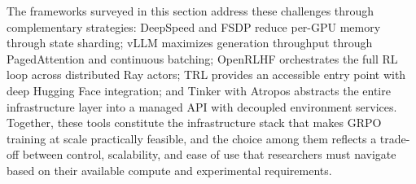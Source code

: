 The frameworks surveyed in this section address these challenges through complementary strategies: DeepSpeed and FSDP reduce per-GPU memory through state sharding; vLLM maximizes generation throughput through PagedAttention and continuous batching; OpenRLHF orchestrates the full RL loop across distributed Ray actors; TRL provides an accessible entry point with deep Hugging Face integration; and Tinker with Atropos abstracts the entire infrastructure layer into a managed API with decoupled environment services. Together, these tools constitute the infrastructure stack that makes GRPO training at scale practically feasible, and the choice among them reflects a trade-off between control, scalability, and ease of use that researchers must navigate based on their available compute and experimental requirements.
